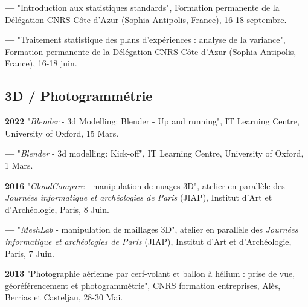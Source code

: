 \documentclass{article}
\newcommand{\fr}[1]{#1}       %
\newcommand{\en}[1]{}     %
\begin{document}
\smallbreak
\textbf{--- }
\fr{"Introduction aux statistiques standards", Formation permanente de la Délégation CNRS Côte d'Azur (Sophia-Antipolis, France), 16-18 septembre.}
\en{"Introduction to standard statistics", Permanent Training of the CNRS Côte d'Azur Delegation (Sophia-Antipolis, France), September 16-18.}

\smallbreak
\textbf{--- }
\fr{"Traitement statistique des plans d'expériences : analyse de la variance", Formation permanente de la Délégation CNRS Côte d'Azur (Sophia-Antipolis, France), 16-18 juin.}
\en{"Statistical treatment of experimental designs: analysis of variance", Permanent Training of the CNRS Côte d'Azur Delegation (Sophia-Antipolis, France), June 16-18.}

\subsection*{\fr{3D / Photogrammétrie}\en{3D / Photogrammetry}}

\textbf{2022 }
\fr{"\textit{Blender} - 3d Modelling: Blender - Up and running", IT Learning Centre, University of Oxford, 15 Mars.}
\en{"\textit{Blender} - 3D Modelling: Blender - Up and Running", IT Learning Centre, University of Oxford, March 15.}

\smallbreak
\textbf{--- }
\fr{"\textit{Blender} - 3d modelling: Kick-off", IT Learning Centre, University of Oxford, 1 Mars.}
\en{"\textit{Blender} - 3D Modelling: Kick-off", IT Learning Centre, University of Oxford, March 1.}

\smallbreak
\textbf{2016 }
\fr{"\textit{CloudCompare} - manipulation de nuages 3D", atelier en parallèle des \textit{Journées informatique et archéologies de Paris} (JIAP), Institut d'Art et d'Archéologie, Paris, 8 Juin.}
\en{"\textit{CloudCompare} - 3D Cloud Manipulation", parallel workshop at the \textit{Computer and Archaeology Days of Paris} (JIAP), Institute of Art and Archaeology, Paris, June 8.}

\smallbreak
\textbf{--- }
\fr{"\textit{MeshLab} - manipulation de maillages 3D", atelier en parallèle des \textit{Journées informatique et archéologies de Paris} (JIAP), Institut d'Art et d'Archéologie, Paris, 7 Juin.}
\en{"\textit{MeshLab} - 3D Mesh Manipulation", parallel workshop at the \textit{Computer and Archaeology Days of Paris} (JIAP), Institute of Art and Archaeology, Paris, June 7.}

\smallbreak
\textbf{2013 }
\fr{"Photographie aérienne par cerf-volant et ballon à hélium : prise de vue, géoréférencement et photogrammétrie", CNRS formation entreprises, Alès, Berrias et Casteljau, 28-30 Mai.}
\en{"Kite and Helium Balloon Aerial Photography: Shooting, Georeferencing, and Photogrammetry", CNRS Corporate Training, Alès, Berrias and Casteljau, May 28-30.}
\end{document}

